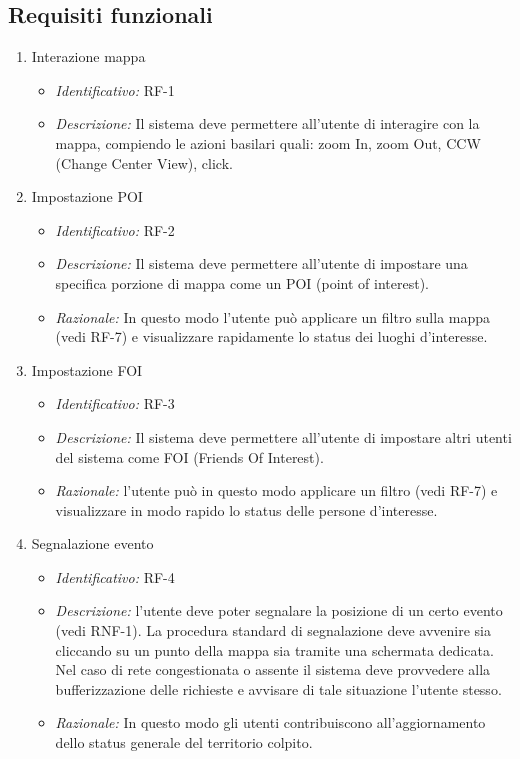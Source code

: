  \subsection{Requisiti funzionali}

\begin{enumerate}
\item Interazione mappa
  \begin{itemize}
     \item\textit{Identificativo:} RF-1
  \item\textit{Descrizione:} Il sistema deve permettere all’utente di interagire con la mappa, compiendo le azioni basilari quali: zoom In, zoom Out, CCW (Change Center View), click.
  \end{itemize}
  \newpage
\item Impostazione POI
  \begin{itemize}
  \item\textit{Identificativo:} RF-2
  \item\textit{Descrizione:} Il sistema deve permettere all’utente di impostare una specifica porzione di mappa come un POI (point of interest).
  \item\textit{Razionale:} In questo modo l’utente può applicare un filtro sulla mappa (vedi RF-7)  e visualizzare rapidamente lo status dei luoghi d’interesse.
  \end{itemize}
  
\item Impostazione FOI
  \begin{itemize}
  \item\textit{Identificativo:} RF-3
  \item\textit{Descrizione:} Il sistema deve permettere all’utente di impostare altri utenti del sistema come FOI (Friends Of Interest).
  \item\textit{Razionale:} l’utente può in questo modo applicare un filtro (vedi RF-7) e visualizzare in modo rapido lo status delle persone d’interesse.
  \end{itemize}
  
  \item Segnalazione evento
  \begin{itemize}
  \item\textit{Identificativo:} RF-4
  \item\textit{Descrizione:} l’utente deve poter segnalare la posizione di un certo evento (vedi RNF-1). 
La procedura standard di segnalazione deve avvenire sia cliccando su un punto della mappa sia tramite una schermata dedicata.
Nel caso di rete congestionata o assente il sistema deve provvedere alla bufferizzazione delle richieste e avvisare di tale situazione l’utente stesso.
  \item\textit{Razionale:} In questo modo gli utenti contribuiscono all’aggiornamento dello status generale del territorio colpito.
  \end{itemize}
  

\end{enumerate}
